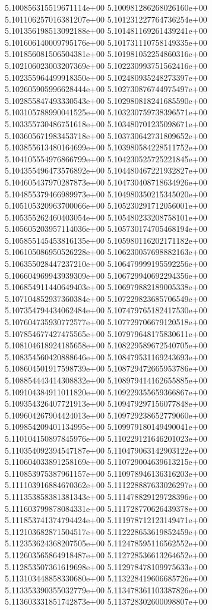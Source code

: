 5.100856315519671114e+00
5.100981286268026160e+00
5.101106257016381207e+00
5.101231227764736254e+00
5.101356198513092188e+00
5.101481169261439241e+00
5.101606140009795176e+00
5.101731110758149335e+00
5.101856081506504381e+00
5.101981052254860316e+00
5.102106023003207369e+00
5.102230993751562416e+00
5.102355964499918350e+00
5.102480935248273397e+00
5.102605905996628444e+00
5.102730876744975497e+00
5.102855847493330543e+00
5.102980818241685590e+00
5.103105788990041525e+00
5.103230759738396571e+00
5.103355730486751618e+00
5.103480701235098671e+00
5.103605671983453718e+00
5.103730642731809652e+00
5.103855613480164699e+00
5.103980584228511752e+00
5.104105554976866799e+00
5.104230525725221845e+00
5.104355496473576892e+00
5.104480467221932827e+00
5.104605437970287873e+00
5.104730408718634926e+00
5.104855379466989973e+00
5.104980350215345020e+00
5.105105320963700066e+00
5.105230291712056001e+00
5.105355262460403054e+00
5.105480233208758101e+00
5.105605203957114036e+00
5.105730174705468194e+00
5.105855145453816135e+00
5.105980116202171182e+00
5.106105086950526228e+00
5.106230057698882163e+00
5.106355028447237210e+00
5.106479999195592256e+00
5.106604969943939309e+00
5.106729940692294356e+00
5.106854911440649403e+00
5.106979882189005338e+00
5.107104852937360384e+00
5.107229823685706549e+00
5.107354794434062484e+00
5.107479765182417530e+00
5.107604735930772577e+00
5.107729706679120518e+00
5.107854677427475565e+00
5.107979648175830611e+00
5.108104618924185658e+00
5.108229589672540705e+00
5.108354560420888646e+00
5.108479531169243693e+00
5.108604501917598739e+00
5.108729472665953786e+00
5.108854443414308832e+00
5.108979414162655885e+00
5.109104384911011820e+00
5.109229355659366867e+00
5.109354326407721913e+00
5.109479297156077848e+00
5.109604267904424013e+00
5.109729238652779060e+00
5.109854209401134995e+00
5.109979180149490041e+00
5.110104150897845976e+00
5.110229121646201023e+00
5.110354092394547187e+00
5.110479063142903122e+00
5.110604033891258169e+00
5.110729004639613215e+00
5.110853975387961157e+00
5.110978946136316203e+00
5.111103916884670362e+00
5.111228887633026297e+00
5.111353858381381343e+00
5.111478829129728396e+00
5.111603799878084331e+00
5.111728770626439378e+00
5.111853741374794424e+00
5.111978712123149471e+00
5.112103682871504517e+00
5.112228653619852459e+00
5.112353624368207505e+00
5.112478595116562552e+00
5.112603565864918487e+00
5.112728536613264652e+00
5.112853507361619698e+00
5.112978478109975633e+00
5.113103448858330680e+00
5.113228419606685726e+00
5.113353390355032779e+00
5.113478361103387826e+00
5.113603331851742873e+00
5.113728302600098807e+00

